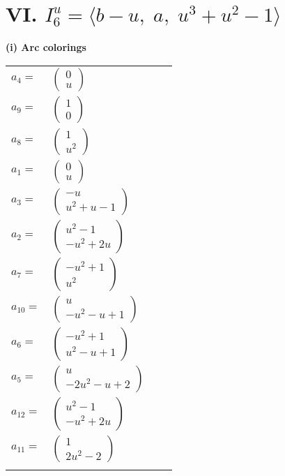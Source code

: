 \documentclass[1p]{elsarticle_modified}
\theoremstyle{definition}
\begin{document}
\centering \section*{VI. $I^u_{6}= \langle b- u,\;a,\;u^3+u^2-1 \rangle$}
\flushleft \textbf{(i) Arc colorings}\\
\begin{tabular}{m{7pt} m{180pt} m{7pt} m{180pt} }
\flushright $a_{4}=$&$\begin{pmatrix}0\\u\end{pmatrix}$ \\
\flushright $a_{9}=$&$\begin{pmatrix}1\\0\end{pmatrix}$ \\
\flushright $a_{8}=$&$\begin{pmatrix}1\\u^2\end{pmatrix}$ \\
\flushright $a_{1}=$&$\begin{pmatrix}0\\u\end{pmatrix}$ \\
\flushright $a_{3}=$&$\begin{pmatrix}- u\\u^2+u-1\end{pmatrix}$ \\
\flushright $a_{2}=$&$\begin{pmatrix}u^2-1\\- u^2+2 u\end{pmatrix}$ \\
\flushright $a_{7}=$&$\begin{pmatrix}- u^2+1\\u^2\end{pmatrix}$ \\
\flushright $a_{10}=$&$\begin{pmatrix}u\\- u^2- u+1\end{pmatrix}$ \\
\flushright $a_{6}=$&$\begin{pmatrix}- u^2+1\\u^2- u+1\end{pmatrix}$ \\
\flushright $a_{5}=$&$\begin{pmatrix}u\\-2 u^2- u+2\end{pmatrix}$ \\
\flushright $a_{12}=$&$\begin{pmatrix}u^2-1\\- u^2+2 u\end{pmatrix}$ \\
\flushright $a_{11}=$&$\begin{pmatrix}1\\2 u^2-2\end{pmatrix}$\\&\end{tabular}
\end{document}
